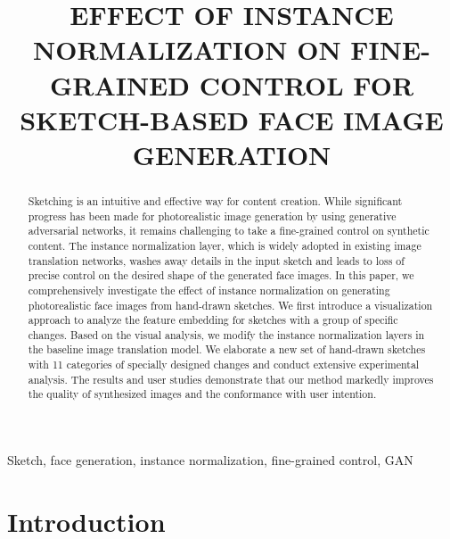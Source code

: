 \documentclass{article}
\title{EFFECT OF INSTANCE NORMALIZATION ON FINE-GRAINED CONTROL FOR SKETCH-BASED FACE IMAGE GENERATION}
\begin{document}
%
\maketitle
%
\begin{abstract}
Sketching is an intuitive and effective way for content creation. While significant progress has been made for photorealistic image generation by using generative adversarial networks, it remains challenging to take a fine-grained control on synthetic content.  
The instance normalization layer, which is widely adopted in existing image translation networks, washes away details in the input sketch and leads to loss of precise control on the desired shape of the generated face images.
In this paper, we comprehensively investigate the effect of instance normalization on generating photorealistic face images from hand-drawn sketches.
We first introduce a visualization approach to analyze the feature embedding for sketches with a group of specific changes.  
Based on the visual analysis, we modify the instance normalization layers in the baseline image translation model. 
We elaborate a new set of hand-drawn sketches with 11 categories of specially designed changes and conduct extensive experimental analysis.  
The results and user studies demonstrate that our method markedly improves the quality of synthesized images and the conformance with user intention.
\end{abstract}
%
\begin{keywords}
Sketch, face generation, instance normalization, fine-grained control, GAN
\end{keywords}
%
\section{Introduction}
\label{sec:intro}
\end{document}
